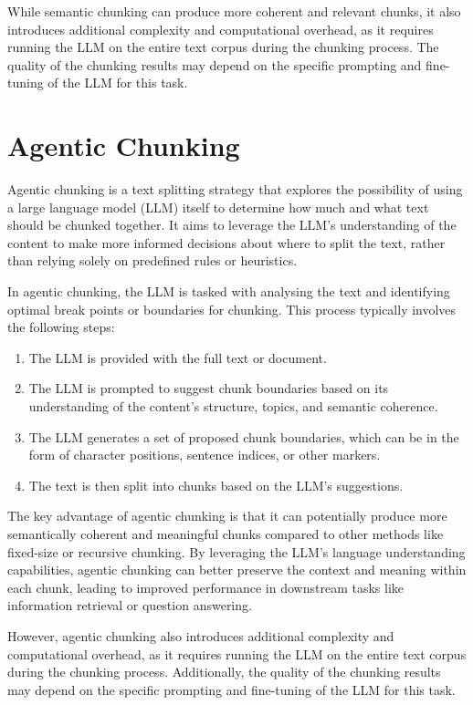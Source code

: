 \documentclass[
  letterpaper,
  DIV=11,
  numbers=noendperiod]{scrartcl}
\providecommand{\tightlist}{%
  \setlength{\itemsep}{0pt}\setlength{\parskip}{0pt}}\usepackage{longtable,booktabs,array}
\begin{document}
While semantic chunking can produce more coherent and relevant chunks,
it also introduces additional complexity and computational overhead, as
it requires running the LLM on the entire text corpus during the
chunking process. The quality of the chunking results may depend on the
specific prompting and fine-tuning of the LLM for this task.

\section{Agentic Chunking}\label{agentic-chunking}

Agentic chunking is a text splitting strategy that explores the
possibility of using a large language model (LLM) itself to determine
how much and what text should be chunked together. It aims to leverage
the LLM's understanding of the content to make more informed decisions
about where to split the text, rather than relying solely on predefined
rules or heuristics.

In agentic chunking, the LLM is tasked with analysing the text and
identifying optimal break points or boundaries for chunking. This
process typically involves the following steps:

\begin{enumerate}
\def\labelenumi{\arabic{enumi}.}
\tightlist
\item
  The LLM is provided with the full text or document.
\item
  The LLM is prompted to suggest chunk boundaries based on its
  understanding of the content's structure, topics, and semantic
  coherence.
\item
  The LLM generates a set of proposed chunk boundaries, which can be in
  the form of character positions, sentence indices, or other markers.
\item
  The text is then split into chunks based on the LLM's suggestions.
\end{enumerate}

The key advantage of agentic chunking is that it can potentially produce
more semantically coherent and meaningful chunks compared to other
methods like fixed-size or recursive chunking. By leveraging the LLM's
language understanding capabilities, agentic chunking can better
preserve the context and meaning within each chunk, leading to improved
performance in downstream tasks like information retrieval or question
answering.

However, agentic chunking also introduces additional complexity and
computational overhead, as it requires running the LLM on the entire
text corpus during the chunking process. Additionally, the quality of
the chunking results may depend on the specific prompting and
fine-tuning of the LLM for this task.
\end{document}
